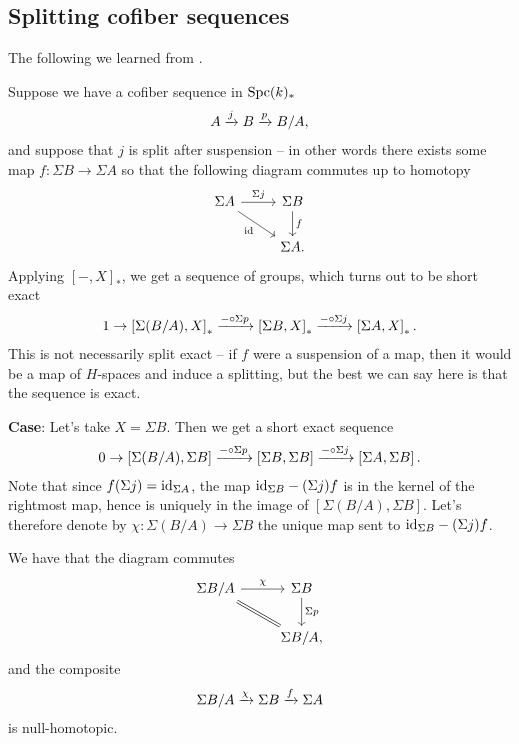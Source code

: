 \documentclass[11pt,openany]{book}
\begin{document}
\subsection{Splitting cofiber sequences}

The following we learned from \cite[Appendix~A]{DI-Hopf}.

Suppose we have a cofiber sequence in $\mathrm{Spc}(k)_\ast$
\begin{align*}
    A \xrightarrow{j} B \xrightarrow{p} B/A,
\end{align*}
and suppose that $j$ is split after suspension -- in other words there exists some map $f \colon \Sigma B \to \Sigma A$ so that the following diagram commutes up to homotopy
\[ \begin{tikzcd}
    \Sigma A\ar[dr,"\id" below left]\rar["\Sigma j" above] & \Sigma B\dar["f" right]\\
     & \Sigma A.
\end{tikzcd} \]
Applying $\left[ -,X \right]_\ast$, we get a sequence of groups, which turns out to be short exact
\begin{align*}
    1 \to \left[ \Sigma(B/A),X \right]_\ast \xrightarrow{-\circ \Sigma p} \left[ \Sigma B, X \right]_\ast \xrightarrow{-\circ \Sigma j} \left[ \Sigma A, X \right]_\ast.
\end{align*}
This is not necessarily split exact -- if $f$ were a suspension of a map, then it would be a map of $H$-spaces and induce a splitting, but the best we can say here is that the sequence is exact.

\textbf{Case}: Let's take $X = \Sigma B$. Then we get a short exact sequence
\begin{align*}
    0 \to \left[ \Sigma(B/A), \Sigma B \right] \xrightarrow{-\circ \Sigma p} \left[ \Sigma B, \Sigma B \right] \xrightarrow{-\circ \Sigma j}\left[ \Sigma A, \Sigma B \right].
\end{align*}
Note that since $f(\Sigma j) = \mathrm{id}_{\Sigma A}$, the map $\mathrm{id}_{\Sigma B} - (\Sigma j)f$ is in the kernel of the rightmost map, hence is uniquely in the image of $\left[ \Sigma(B/A), \Sigma B \right]$. Let's therefore denote by $\chi \colon \Sigma (B/A) \to \Sigma B$ the unique map sent to $\mathrm{id}_{\Sigma B} - (\Sigma j)f$.

\begin{lemma} \cite[A.3]{DI-Hopf} We have that the diagram commutes
\[ \begin{tikzcd}
    \Sigma B/A\rar["\chi" above]\ar[dr,equal] & \Sigma B\dar["\Sigma p" right]\\
     & \Sigma B/A,
\end{tikzcd} \]
and the composite
\begin{align*}
    \Sigma B/A \xrightarrow{\chi} \Sigma B \xrightarrow{f} \Sigma A
\end{align*}
is null-homotopic.
\end{lemma}
\end{document}
